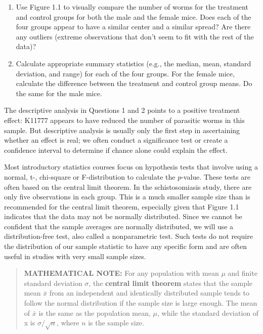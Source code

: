 \documentclass[
]{report}
\begin{document}
\begin{enumerate}
\def\labelenumi{\arabic{enumi}.}
\item
  Use Figure 1.1 to visually compare the number of worms for the treatment and control groups for both the male and the female mice. Does each of the four groups appear to have a similar center and a similar spread? Are there any outliers (extreme observations that don't seem to fit with the rest of the data)?
\item
  Calculate appropriate summary statistics (e.g., the median, mean, standard deviation, and range) for each of the four groups. For the female mice, calculate the difference between the treatment and control group means. Do the same for the male mice.
\end{enumerate}

The descriptive analysis in Questions 1 and 2 points to a positive treatment effect: K11777 appears to have reduced the number of parasitic worms in this sample. But descriptive analysis is usually only the first step in ascertaining whether an effect is real; we often conduct a significance test or create a confidence interval to determine if chance alone could explain the effect.

Most introductory statistics courses focus on hypothesis tests that involve using a normal, t-, chi-square or F-distribution to calculate the \(\scriptstyle p\)-value. These tests are often based on the central limit theorem. In the schistosomiasis study, there are only five observations in each group. This is a much smaller sample size than is recommended for the central limit theorem, especially given that Figure 1.1 indicates that the data may not be normally distributed. Since we cannot be confident that the sample averages are normally distributed, we will use a distribution-free test, also called a nonparametric test. Such tests do not require
the distribution of our sample statistic to have any specific form and are often useful in studies with very small sample sizes.

\begin{quote}
\textbf{MATHEMATICAL NOTE:} For any population with mean \(\scriptstyle \mu\) and finite standard deviation \(\scriptstyle \sigma\), the \textbf{central limit theorem} states that the sample mean \(\scriptstyle \bar{x}\) from an independent and identically distributed sample tends to follow the normal distribution if the sample size is large enough. The mean of \(\scriptstyle \bar{x}\) is the same as the population mean, \(\scriptstyle \mu\), while the standard deviation of x is \(\scriptstyle \sigma / \sqrt{n}\), where \(\scriptstyle n\) is the sample size.
\end{quote}
\end{document}
